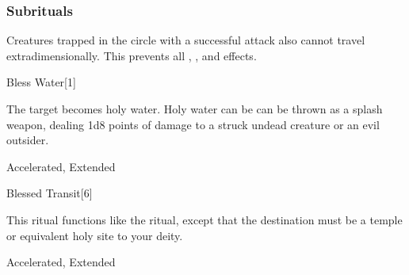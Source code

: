\subsubsection{Subrituals}
Creatures trapped in the circle with a successful attack also cannot travel extradimensionally.
This prevents all , , and  effects.
\begin{spellsection}{Bless Water}[1]
\begin{spellcontent}
\begin{spelltargetinginfo}
\end{spelltargetinginfo}
\begin{spelleffects}
\spelleffect
The target becomes holy water.
Holy water can be can be thrown as a splash weapon, dealing 1d8 points of damage to a struck undead creature or an evil outsider.
\end{spelleffects}
\end{spellcontent}
\begin{spellfooter}
 Accelerated, Extended
\end{spellfooter}
\begin{spellsubcontent}
\end{spellsubcontent}
\end{spellsection}
\begin{spellsection}{Blessed Transit}[6]
\begin{spellcontent}
\begin{spelltargetinginfo}
\end{spelltargetinginfo}
\begin{spelleffects}
\spelleffect
This ritual functions like the  ritual, except that the destination must be a temple or equivalent holy site to your deity.
\end{spelleffects}
\end{spellcontent}
\begin{spellfooter}
 Accelerated, Extended
\end{spellfooter}
\begin{spellsubcontent}
\end{spellsubcontent}
\end{spellsection}
